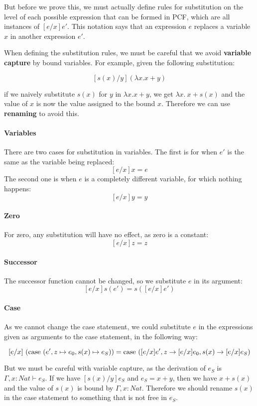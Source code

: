 But before we prove this, we must actually define rules for substitution on the level of each possible expression that can be formed in PCF, which are all instances of $[e/x]e'$. This notation says that an expression $e$ replaces a variable $x$ in another expression $e'$.

When defining the substitution rules, we must be careful  that we avoid \textbf{variable capture} by bound variables. For example, given the following substitution:

\[ [s(x)/y](\lambda x. x + y) \]

if we naively substitute $s(x)$ for $y$ in $\lambda x. x + y$, we get $\lambda x. \ x + s(x)$ and the value of $x$ is now the value assigned to the bound $x$. Therefore we can use \textbf{renaming} to avoid this. 

\paragraph {Variables} There are two cases for substitution in variables. The first is for when $e'$ is the same as the variable being replaced:
\[[e/x]x = e\]
The second one is when $e$ is a completely different variable, for which nothing happens:
\[ [e/x]y = y\]

\paragraph{Zero} For zero, any substitution will have no effect, as zero is a constant:
\[ [e/x]z = z\]

\paragraph{Successor} The successor function cannot be changed, so we substitute $e$ in its argument:
 \[[e/x]s(e') = s([e/x]e')\]
 
\paragraph{Case} As we cannot change the case statement, we could substitute $e$ in the expressions given as arguments to the case statement, in the following way: 

\[ [e/x] \ (\operatorname{case} \ (e', z \mapsto e_0, s(x) \mapsto e_S)) = \operatorname{case} \ ([e/x]e', z \to [e/x]e_0, s(x)  \to [e/x]e_S)\]

But we must be careful with variable capture, as the derivation of $e_S$ is $\Gamma, x:Nat \vdash e_S$. If we have $[s(x)/y] e_S$ and $e_S = x + y$, then we have $x + s(x)$ and the value of $s(x)$ is bound by $\Gamma, x : Nat$. Therefore we should rename $s(x)$ in the case statement to something that is not free in $e_S$.

